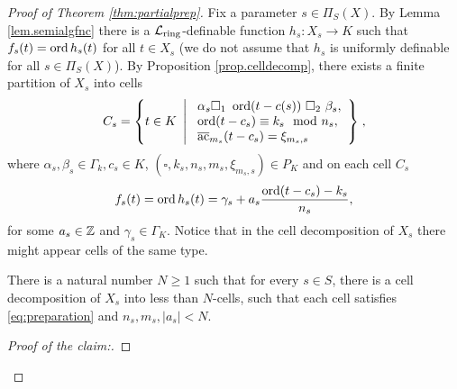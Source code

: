 \begin{proof}[Proof of Theorem \ref{thm:partialprep}]

Fix a parameter $s \in \Pi_S(X)$. By Lemma \ref{lem.semialgfnc} there is a $\mathcal{L}_{\text{ring}}$-definable function {$h_s: X_s\to K$} such that $f_s(t) = \operatorname{ord} h_s(t)$ for all $t \in X_s$ (we do not assume that $h_s$ is uniformly definable for all $s\in \Pi_S(X)$). By Proposition \ref{prop.celldecomp}, there exists a finite partition of $X_s$ into cells  
\begin{equation*}
C_s = \left\{t \in K \ \left| \ \begin{array}{l} \alpha_s \square_1 \ \ord(t-c(s)) \ \square_2 \ \beta_s,\\ \ord(t-c_s) \equiv k_s\mod n_s,\\ \ac_{m_s}(t-c_s) = \xi_{m_s,s} \end{array} \right\}\right.,
\end{equation*}
where $\alpha_s, \beta_s \in \Gamma_k, c_s \in K$, $(\square,k_s, n_s, m_s,\xi_{m_s,s})\in P_K$ and on each cell $C_s$ 
\begin{equation}\label{eq:preparation}
f_s(t)=\operatorname{ord} h_s(t) =\gamma_s + a_s\frac{\operatorname{ord}(t-c_s)-k_s}{n_s},
\end{equation}
for some $a_s\in {\mathbb Z}$ and $\gamma_s\in \Gamma_K$. Notice that in the cell decomposition of $X_s$ there might appear cells of the same type. 

\begin{claim}\label{claim:compact} 
There is a natural number $N\geq 1$ such that for every $s\in S$, there is a cell decomposition of $X_s$ into less than $N$-cells, such that each cell satisfies \ref{eq:preparation} and $n_s,m_s,|a_s|<N$.
\end{claim}

\begin{proof}[Proof of the claim:]


\end{proof}
\end{proof}
